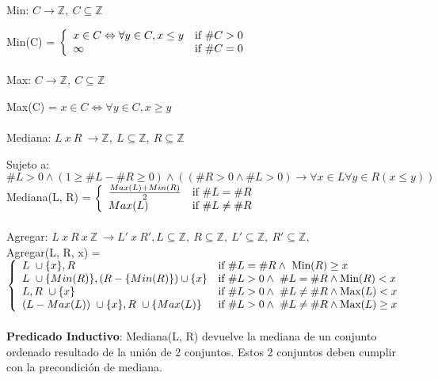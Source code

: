 \documentclass{article}
\theoremstyle{definition}
\theoremstyle{remark}
\begin{document}
    Min: $C \rightarrow \mathds{Z} , \  C \subseteq \mathds{Z} $  
    
    Min(C) = $\left\{ \begin{array}{ll}  x \in C  \Leftrightarrow \forall y \in C, x \leq y  & \mbox{if } \#C > 0 \\ \infty & \mbox{if } \#C = 0 \\ \end{array} \right.$ \\ \\

    Max: $C \rightarrow \mathds{Z} , \  C \subseteq \mathds{Z} $ 
    
    Max(C) = $x \in C  \Leftrightarrow \forall y \in C, x \geq y$ \\ \\

    Mediana: $L \  x\  R \  \rightarrow \mathds{Z}, \ L \subseteq \mathds{Z}, \ R \subseteq \mathds{Z}$
    
    Sujeto a:  $\#L > 0  \wedge  (1 \geq \#L - \#R \geq 0) \wedge ((\#R > 0 \wedge \#L > 0) \rightarrow \forall x \in L \forall y \in R (x \leq y) )$ \\ 
    
    Mediana(L, R) = $\left\{ \begin{array}{ll}  \frac{Max(L) + Min(R)}{2}  & \mbox{if } \#L = \#R \\ Max(L) & \mbox{if } \#L \neq \#R \\ \end{array} \right.$\\ \\

    
    
    Agregar: $L\ x\ R\ x\ \mathds{Z}\ \rightarrow L'\  x\  R', L \subseteq \mathds{Z}, \ R \subseteq \mathds{Z}, \ L' \subseteq \mathds{Z}, \ R' \subseteq \mathds{Z}, \ $\\
    
    Agregar(L, R, x) = $\left\{ \begin{array}{ll}  L  \ \cup \{x\}, R & \mbox{if } \#L = \#R   \wedge \ \text{Min}(R) \geq x \\  L  \ \cup \{Min(R)\}, (R - \{Min(R)\}) \cup \{x\} & \mbox{if }  \#L > 0  \wedge \ \#L = \#R \wedge \text{Min}(R) < x \\ L, R \ \cup \{x\} & \mbox{if } \#L > 0  \wedge \ \#L \neq \#R \wedge \text{Max}(L) < x \\ (L - Max(L)) \ \cup \{x\}, R \ \cup \{Max(L)\}  & \mbox{if } \#L > 0  \wedge \ \#L \neq \#R \wedge \text{Max}(L) \geq x \\ \end{array} \right.$\\
      \\
          
\textbf{Predicado Inductivo}: Mediana(L, R) devuelve la mediana de un conjunto ordenado resultado de la unión de 2 conjuntos. Estos 2 conjuntos deben cumplir con la precondición de mediana.\\
\end{document}
